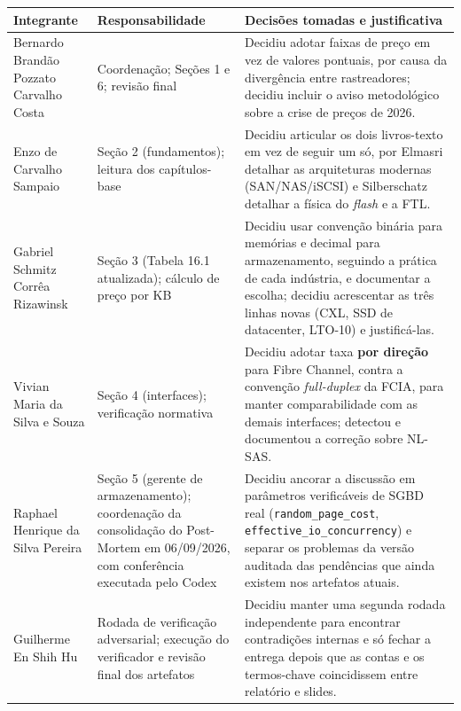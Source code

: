 \documentclass[11pt,a4paper]{article}
\begin{document}
\begin{center}\small
\begin{tabular}{@{}p{3.2cm}p{5.0cm}p{7.0cm}@{}}
\toprule
\textbf{Integrante} & \textbf{Responsabilidade} & \textbf{Decisões tomadas e justificativa} \\
\midrule
Bernardo Brandão Pozzato Carvalho Costa &
Coordenação; Seções 1 e 6; revisão final &
Decidiu adotar faixas de preço em vez de valores pontuais, por causa da divergência entre
rastreadores; decidiu incluir o aviso metodológico sobre a crise de preços de 2026. \\

Enzo de Carvalho Sampaio &
Seção 2 (fundamentos); leitura dos capítulos-base &
Decidiu articular os dois livros-texto em vez de seguir um só, por Elmasri detalhar as
arquiteturas modernas (SAN/NAS/iSCSI) e Silberschatz detalhar a física do \emph{flash} e a
FTL. \\

Gabriel Schmitz Corrêa Rizawinsk &
Seção 3 (Tabela 16.1 atualizada); cálculo de preço por KB &
Decidiu usar convenção binária para memórias e decimal para armazenamento, seguindo a
prática de cada indústria, e documentar a escolha; decidiu acrescentar as três linhas novas
(CXL, SSD de datacenter, LTO-10) e justificá-las. \\

Vivian Maria da Silva e Souza &
Seção 4 (interfaces); verificação normativa &
Decidiu adotar taxa \textbf{por direção} para Fibre Channel, contra a convenção
\emph{full-duplex} da FCIA, para manter comparabilidade com as demais interfaces; detectou
e documentou a correção sobre NL-SAS. \\

Raphael Henrique da Silva Pereira &
Seção 5 (gerente de armazenamento); coordenação da consolidação do Post-Mortem em 06/09/2026,
com conferência executada pelo Codex &
Decidiu ancorar a discussão em parâmetros verificáveis de SGBD real
(\texttt{random\_page\_cost}, \texttt{effective\_io\_concurrency}) e separar os problemas da
versão auditada das pendências que ainda existem nos artefatos atuais. \\

Guilherme En Shih Hu &
Rodada de verificação adversarial; execução do verificador e revisão final dos artefatos &
Decidiu manter uma segunda rodada independente para encontrar contradições internas e só fechar a
entrega depois que as contas e os termos-chave coincidissem entre relatório e slides. \\
\bottomrule
\end{tabular}
\end{center}
\end{document}
